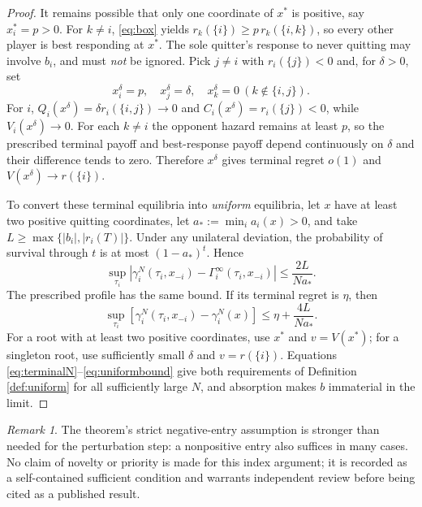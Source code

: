 \documentclass[11pt,a4paper]{article}
\theoremstyle{definition}
\theoremstyle{remark}
\newtheorem{remark}[theorem]{Remark}
\begin{document}
\begin{proof}
It remains possible that only one coordinate of $x^*$ is positive, say $x_i^*=p>0$. For $k\ne i$, \eqref{eq:box} yields $r_k(\{i\})\ge p\,r_k(\{i,k\})$, so every other player is best responding at $x^*$. The sole quitter's response to never quitting may involve $b_i$, and must \emph{not} be ignored. Pick $j\ne i$ with $r_i(\{j\})<0$ and, for $\delta>0$, set
\[
x_i^\delta=p,\quad x_j^\delta=\delta,\quad x_k^\delta=0\ (k\notin\{i,j\}).
\]
For $i$, $Q_i(x^\delta)=\delta r_i(\{i,j\})\to0$ and $C_i(x^\delta)=r_i(\{j\})<0$, while $V_i(x^\delta)\to0$. For each $k\ne i$ the opponent hazard remains at least $p$, so the prescribed terminal payoff and best-response payoff depend continuously on $\delta$ and their difference tends to zero. Therefore $x^\delta$ gives terminal regret $o(1)$ and $V(x^\delta)\to r(\{i\})$.

To convert these terminal equilibria into \emph{uniform} equilibria, let $x$ have at least two positive quitting coordinates, let $a_*:=\min_i a_i(x)>0$, and take $L\ge\max\{|b_i|,|r_i(T)|\}$. Under any unilateral deviation, the probability of survival through $t$ is at most $(1-a_*)^t$. Hence
\begin{equation}\label{eq:terminalN}
\sup_{\tau_i}\left|\gamma_i^N(\tau_i,x_{-i})-\Gamma_i^\infty(\tau_i,x_{-i})\right|\le\frac{2L}{Na_*}.
\end{equation}
The prescribed profile has the same bound. If its terminal regret is $\eta$, then
\begin{equation}\label{eq:uniformbound}
\sup_{\tau_i}\left[\gamma_i^N(\tau_i,x_{-i})-\gamma_i^N(x)\right]
\le\eta+\frac{4L}{Na_*}.
\end{equation}
For a root with at least two positive coordinates, use $x^*$ and $v=V(x^*)$; for a singleton root, use sufficiently small $\delta$ and $v=r(\{i\})$. Equations \eqref{eq:terminalN}--\eqref{eq:uniformbound} give both requirements of Definition \ref{def:uniform} for all sufficiently large $N$, and absorption makes $b$ immaterial in the limit.\qedhere
\end{proof}

\begin{remark}
The theorem's strict negative-entry assumption is stronger than needed for the perturbation step: a nonpositive entry also suffices in many cases. No claim of novelty or priority is made for this index argument; it is recorded as a self-contained sufficient condition and warrants independent review before being cited as a published result.
\end{remark}
\end{document}
